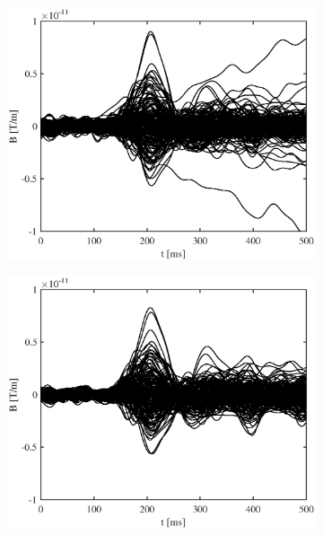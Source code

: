 \documentclass[doc,a4paper,12pt]{apa6}
\begin{document}
\begin{figure}
  \centering
  \captionsetup{justification=centering}
  \begin{subfigure}[c]{0.36\textwidth}
    \includegraphics[width=\textwidth]{ergebnisse/pa07/pa07a1_eve2_raw_grad_butterfly.eps}
    \label{img:butterfly:grad:raw:pa07}
  \end{subfigure}\hspace*{0.08\textwidth}
  \begin{subfigure}[c]{0.36\textwidth}
    \includegraphics[width=\textwidth]{ergebnisse/pa07/pa07a1_eve2_sss_grad_butterfly.eps}

\end{subfigure}
\end{figure}
\end{document}
